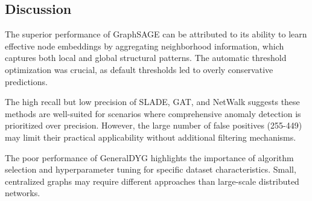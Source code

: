 \subsection{Discussion}

The superior performance of GraphSAGE can be attributed to its ability to learn effective node embeddings by aggregating neighborhood information, which captures both local and global structural patterns. The automatic threshold optimization was crucial, as default thresholds led to overly conservative predictions.

The high recall but low precision of SLADE, GAT, and NetWalk suggests these methods are well-suited for scenarios where comprehensive anomaly detection is prioritized over precision. However, the large number of false positives (255-449) may limit their practical applicability without additional filtering mechanisms.

The poor performance of GeneralDYG highlights the importance of algorithm selection and hyperparameter tuning for specific dataset characteristics. Small, centralized graphs may require different approaches than large-scale distributed networks.

% 

% 
